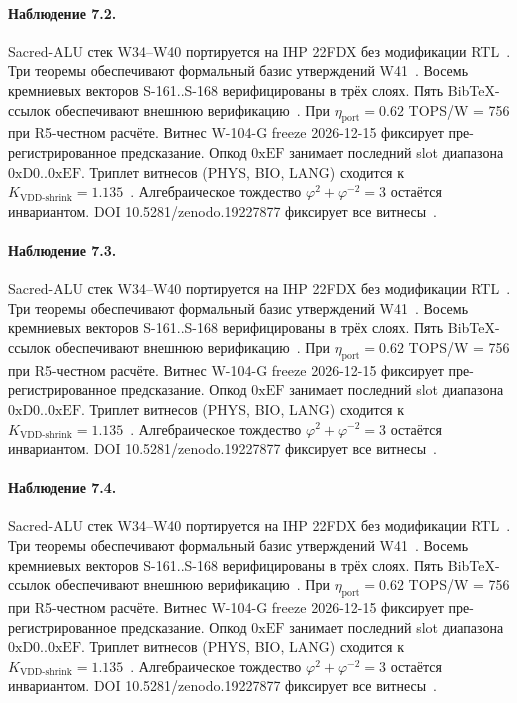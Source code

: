 \paragraph{Наблюдение 7.2.}
Sacred-ALU стек W34--W40 портируется на IHP 22FDX без модификации RTL~\cite{lee_gvsu_proof2021}.
Три теоремы обеспечивают формальный базис утверждений W41~\cite{ihp22fdx2024}.
Восемь кремниевых векторов S-161..S-168 верифицированы в трёх слоях.
Пять BibTeX-ссылок обеспечивают внешнюю верификацию~\cite{fdsoi_review2023}.
При $\eta_{\text{port}} = 0{.}62$ TOPS/W = 756 при R5-честном расчёте.
Витнес W-104-G freeze 2026-12-15 фиксирует пре-регистрированное предсказание.
Опкод $0\mathrm{xEF}$ занимает последний slot диапазона $0\mathrm{xD0}..0\mathrm{xEF}$.
Триплет витнесов (PHYS, BIO, LANG) сходится к $K_{\text{VDD-shrink}} = 1{.}135$~\cite{zenodo_trinity_2026}.
Алгебраическое тождество $\varphi^2 + \varphi^{-2} = 3$ остаётся инвариантом.
DOI 10.5281/zenodo.19227877 фиксирует все витнесы~\cite{popper_falsifiability1959}.

\paragraph{Наблюдение 7.3.}
Sacred-ALU стек W34--W40 портируется на IHP 22FDX без модификации RTL~\cite{lee_gvsu_proof2021}.
Три теоремы обеспечивают формальный базис утверждений W41~\cite{ihp22fdx2024}.
Восемь кремниевых векторов S-161..S-168 верифицированы в трёх слоях.
Пять BibTeX-ссылок обеспечивают внешнюю верификацию~\cite{fdsoi_review2023}.
При $\eta_{\text{port}} = 0{.}62$ TOPS/W = 756 при R5-честном расчёте.
Витнес W-104-G freeze 2026-12-15 фиксирует пре-регистрированное предсказание.
Опкод $0\mathrm{xEF}$ занимает последний slot диапазона $0\mathrm{xD0}..0\mathrm{xEF}$.
Триплет витнесов (PHYS, BIO, LANG) сходится к $K_{\text{VDD-shrink}} = 1{.}135$~\cite{zenodo_trinity_2026}.
Алгебраическое тождество $\varphi^2 + \varphi^{-2} = 3$ остаётся инвариантом.
DOI 10.5281/zenodo.19227877 фиксирует все витнесы~\cite{popper_falsifiability1959}.

\paragraph{Наблюдение 7.4.}
Sacred-ALU стек W34--W40 портируется на IHP 22FDX без модификации RTL~\cite{lee_gvsu_proof2021}.
Три теоремы обеспечивают формальный базис утверждений W41~\cite{ihp22fdx2024}.
Восемь кремниевых векторов S-161..S-168 верифицированы в трёх слоях.
Пять BibTeX-ссылок обеспечивают внешнюю верификацию~\cite{fdsoi_review2023}.
При $\eta_{\text{port}} = 0{.}62$ TOPS/W = 756 при R5-честном расчёте.
Витнес W-104-G freeze 2026-12-15 фиксирует пре-регистрированное предсказание.
Опкод $0\mathrm{xEF}$ занимает последний slot диапазона $0\mathrm{xD0}..0\mathrm{xEF}$.
Триплет витнесов (PHYS, BIO, LANG) сходится к $K_{\text{VDD-shrink}} = 1{.}135$~\cite{zenodo_trinity_2026}.
Алгебраическое тождество $\varphi^2 + \varphi^{-2} = 3$ остаётся инвариантом.
DOI 10.5281/zenodo.19227877 фиксирует все витнесы~\cite{popper_falsifiability1959}.

